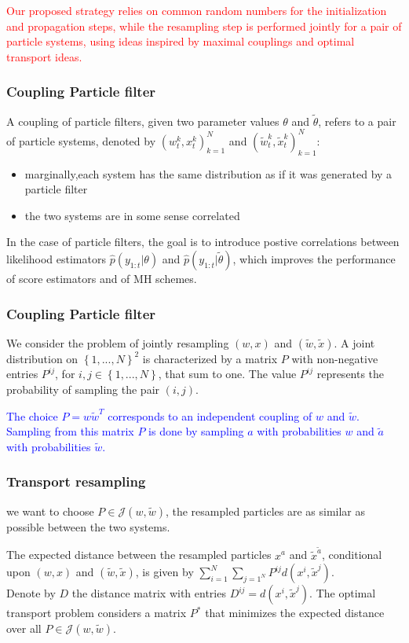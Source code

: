 \documentclass[table]{beamer}
\begin{document}
\begin{CJK}{UTF8}{gbsn}
\begin{frame}
\textcolor{red}{ Our proposed strategy relies on common random numbers for the initialization and propagation steps,
while the resampling step is performed jointly for a pair of particle systems, using ideas inspired
by maximal couplings and optimal transport ideas.}
\end{frame}
\begin{frame}
\frametitle{Coupling Particle filter}
 A coupling of particle filters, given two parameter values $\theta$ and $\tilde{\theta}$, refers to a pair of particle systems, denoted by $(w_t^k,x_t^k)_{k=1}^N$ and $(\tilde{w}_t^k,\tilde{x}_t^k)_{k=1}^N$:
\begin{itemize}
\item marginally,each system has the same distribution as if it was generated by a particle filter
\item the two systems are in some sense correlated
\end{itemize}
In the case of particle filters, the goal is to introduce postive correlations between likelihood estimators $\hat{p}(y_{1:t}|\theta)$ and $\hat{p}(y_{1:t}|\tilde{\theta})$, which improves the performance of score estimators and of MH schemes.
\end{frame}
\begin{frame}
\frametitle{Coupling Particle filter}
We consider the problem of jointly resampling $(w,x)$ and $(\tilde{w},\tilde{x})$. A joint distribution on $\left\{1,...,N \right\}^2$ is characterized by a matrix $P$ with non-negative entries $P^{ij}$, for $i,j \in \left\{1,...,N \right\}$, that sum to one. The value $P^{ij}$ represents the probability of sampling the pair $(i,j)$.\\

\hfill
\vspace{6pt}


\textcolor{blue}{The choice $P = w \tilde{w}^T$ corresponds to an independent coupling of $w$ and $\tilde{w}$. Sampling from this matrix $P$ is done by sampling $a$ with probabilities $w$ and $\tilde{a}$ with probabilities $\tilde{w}$.}

\end{frame}

\begin{frame}
\frametitle{Transport resampling}
we want to choose  $P \in \mathcal{J}(w,\tilde{w})$, the resampled particles are as similar as possible between the two systems.

\hfill
\vspace{6pt}


The expected distance between the resampled particles $x^a$ and $\tilde{x}^{\tilde{a}}$, conditional upon $(w,x)$ and $(\tilde{w},\tilde{x})$, is given by $\sum_{i=1}^N \sum_{j=1^N} P^{ij}d(x^i,\tilde{x}^j)$. \\

Denote by $D$ the distance matrix with entries $D^{ij} = d(x^i,\tilde{x}^j)$. The optimal transport problem considers a matrix $P^*$ that minimizes the expected distance over all $P \in \mathcal{J}(w,\tilde{w})$.
\end{frame}



\end{CJK}
\end{document}
